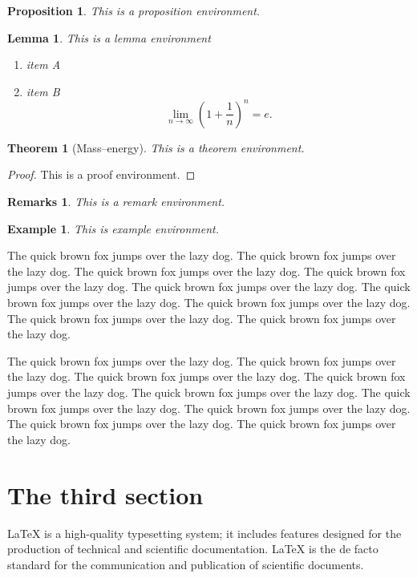 \documentclass[openany,twoside,12pt]{book}
\theoremstyle{plain}
\newtheorem{proposition}{Proposition}[chapter]
\newtheorem{lemma}{Lemma}[chapter]
\newtheorem{theorem}{Theorem}[chapter]
\newtheorem{example}{Example}[chapter]
\newtheorem{remark}{Remarks}[chapter]
\numberwithin{equation}{chapter}
\numberwithin{figure}{chapter}
\numberwithin{table}{chapter}
\begin{document}
\begin{proposition}
This is a proposition environment.
\end{proposition}

\begin{lemma}
This is a lemma environment
\begin{enumerate}[label=\rm (\roman*)]
  \item item A
  \item item B
  \begin{equation}\label{eq:limite}
    \lim_{n\to\infty}\left(1+\frac{1}{n}\right)^n=e.
  \end{equation}
\end{enumerate}
\end{lemma}

\begin{theorem}[Mass--energy]
This is a theorem environment.
\end{theorem}
\begin{proof}
  This is a proof environment.
\end{proof}

\begin{remark}
  This is a remark environment.
\end{remark}

\begin{example}
  This is example environment.
\end{example}

The quick brown fox jumps over the lazy dog. The quick brown fox jumps over the lazy dog. The quick brown fox jumps over the lazy dog. The quick brown fox jumps over the lazy dog. The quick brown fox jumps over the lazy dog. The quick brown fox jumps over the lazy dog. The quick brown fox jumps over the lazy dog. The quick brown fox jumps over the lazy dog. The quick brown fox jumps over the lazy dog.

The quick brown fox jumps over the lazy dog. The quick brown fox jumps over the lazy dog. The quick brown fox jumps over the lazy dog. The quick brown fox jumps over the lazy dog. The quick brown fox jumps over the lazy dog. The quick brown fox jumps over the lazy dog. The quick brown fox jumps over the lazy dog. The quick brown fox jumps over the lazy dog. The quick brown fox jumps over the lazy dog.

\section{The third section}
LaTeX is a high-quality typesetting system; it includes features designed for the production of technical and scientific documentation. LaTeX is the de facto standard for the communication and publication of scientific documents.
\end{document}

